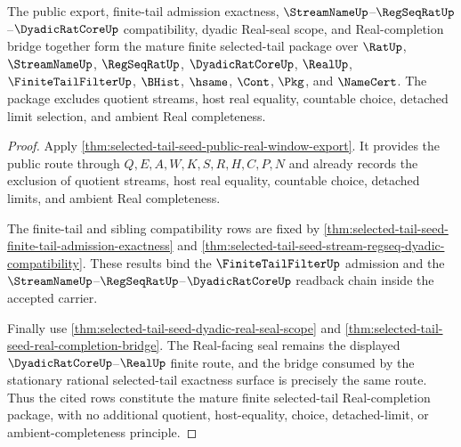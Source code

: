 \begin{theorem}
\label{thm:selected-tail-seed-mature-real-completion-package}
The public export, finite-tail admission exactness, $\StreamNameUp$--$\RegSeqRatUp$--$\DyadicRatCoreUp$ compatibility, dyadic Real-seal scope, and Real-completion bridge together form the mature finite selected-tail package over $\RatUp$, $\StreamNameUp$, $\RegSeqRatUp$, $\DyadicRatCoreUp$, $\RealUp$, $\FiniteTailFilterUp$, $\BHist$, $\hsame$, $\Cont$, $\Pkg$, and $\NameCert$. The package excludes quotient streams, host real equality, countable choice, detached limit selection, and ambient Real completeness.
\end{theorem}
\begin{proof}
Apply \autoref{thm:selected-tail-seed-public-real-window-export}. It provides the public route through $Q,E,A,W,K,S,R,H,C,P,N$ and already records the exclusion of quotient streams, host real equality, countable choice, detached limits, and ambient Real completeness.

The finite-tail and sibling compatibility rows are fixed by \autoref{thm:selected-tail-seed-finite-tail-admission-exactness} and \autoref{thm:selected-tail-seed-stream-regseq-dyadic-compatibility}. These results bind the $\FiniteTailFilterUp$ admission and the $\StreamNameUp$--$\RegSeqRatUp$--$\DyadicRatCoreUp$ readback chain inside the accepted carrier.

Finally use \autoref{thm:selected-tail-seed-dyadic-real-seal-scope} and \autoref{thm:selected-tail-seed-real-completion-bridge}. The Real-facing seal remains the displayed $\DyadicRatCoreUp$--$\RealUp$ finite route, and the bridge consumed by the stationary rational selected-tail exactness surface is precisely the same route. Thus the cited rows constitute the mature finite selected-tail Real-completion package, with no additional quotient, host-equality, choice, detached-limit, or ambient-completeness principle.
\end{proof}


